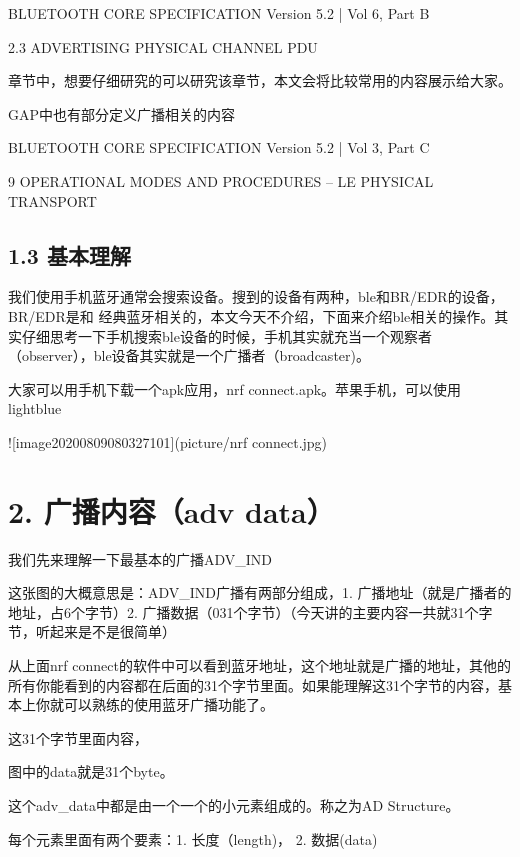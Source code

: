 \documentclass[letterpaper,10pt,english]{sphinxmanual}
\begin{document}
BLUETOOTH CORE SPECIFICATION Version 5.2 | Vol 6, Part B

2.3 ADVERTISING PHYSICAL CHANNEL PDU

章节中，想要仔细研究的可以研究该章节，本文会将比较常用的内容展示给大家。

GAP中也有部分定义广播相关的内容

BLUETOOTH CORE SPECIFICATION Version 5.2 | Vol 3, Part C

9 OPERATIONAL MODES AND PROCEDURES – LE
PHYSICAL TRANSPORT


\subsection{1.3 基本理解}
\label{\detokenize{test/ble_adv_scan_all:id3}}
我们使用手机蓝牙通常会搜索设备。搜到的设备有两种，ble和BR/EDR的设备，BR/EDR是和 经典蓝牙相关的，本文今天不介绍，下面来介绍ble相关的操作。其实仔细思考一下手机搜索ble设备的时候，手机其实就充当一个观察者（observer），ble设备其实就是一个广播者（broadcaster)。

大家可以用手机下载一个apk应用，nrf connect.apk。苹果手机，可以使用lightblue

!{[}image\sphinxhyphen{}20200809080327101{]}(picture/nrf connect.jpg)


\section{2. 广播内容（adv data）}
\label{\detokenize{test/ble_adv_scan_all:adv-data}}
我们先来理解一下最基本的广播ADV\_IND


这张图的大概意思是：ADV\_IND广播有两部分组成，1. 广播地址（就是广播者的地址，占6个字节）2. 广播数据（0\sphinxhyphen{}31个字节）（今天讲的主要内容一共就31个字节，听起来是不是很简单）

从上面nrf connect的软件中可以看到蓝牙地址，这个地址就是广播的地址，其他的所有你能看到的内容都在后面的31个字节里面。如果能理解这31个字节的内容，基本上你就可以熟练的使用蓝牙广播功能了。

这31个字节里面内容，



图中的data就是31个byte。

这个adv\_data中都是由一个一个的小元素组成的。称之为AD Structure。

每个元素里面有两个要素：1. 长度（length)， 2. 数据(data)
\end{document}
